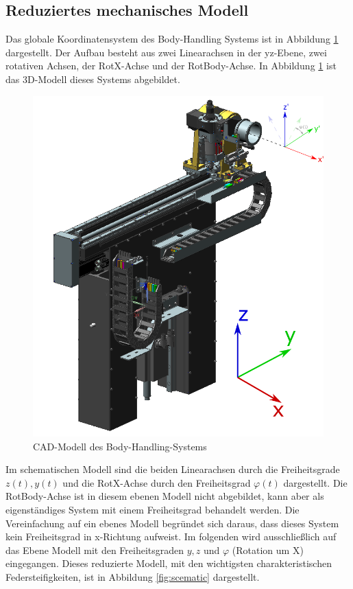 \documentclass[10pt,a4paper]{iace.report}
\begin{document}
			\subsection{Reduziertes mechanisches Modell}
				Das globale Koordinatensystem des Body-Handling Systems ist in Abbildung \ref{fig:cad} dargestellt. Der Aufbau besteht aus zwei Linearachsen in der yz-Ebene, zwei rotativen Achsen, der RotX-Achse und der RotBody-Achse. In Abbildung \ref{fig:cad} ist das 3D-Modell dieses Systems abgebildet. 
				\begin{figure}[h!]
					\centering
					\includegraphics[width=0.6\linewidth]{./pics/aufbau_cad.png}
					\caption{CAD-Modell des Body-Handling-Systems}
					\label{fig:cad}
				\end{figure}
				Im schematischen Modell sind die beiden Linearachsen durch die Freiheitsgrade $ z(t),y(t) $ und die RotX-Achse durch den Freiheitsgrad $ \varphi(t) $ dargestellt. Die RotBody-Achse ist in diesem ebenen Modell nicht abgebildet, kann aber als eigenständiges System mit einem Freiheitsgrad behandelt werden. Die Vereinfachung auf ein ebenes Modell begründet sich daraus, dass dieses System kein Freiheitsgrad in x-Richtung aufweist. Im folgenden wird ausschließlich auf das Ebene Modell mit den Freiheitsgraden $ y,z $ und $ \varphi $ (Rotation um X) eingegangen. Dieses reduzierte Modell, mit den wichtigsten charakteristischen Federsteifigkeiten, ist in Abbildung \ref{fig:scematic} dargestellt.
\end{document}
